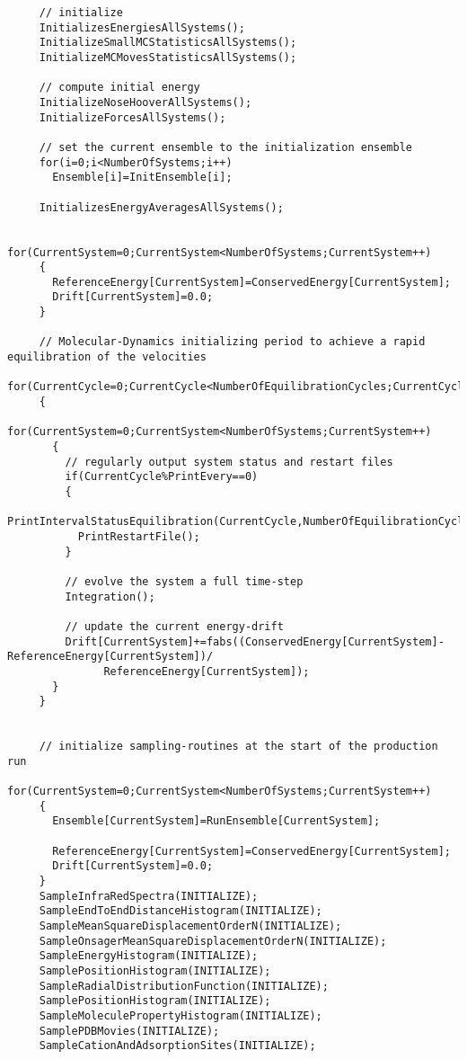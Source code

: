 \begin{footnotesize}
\begin{verbatim}
     // initialize
     InitializesEnergiesAllSystems();
     InitializeSmallMCStatisticsAllSystems();
     InitializeMCMovesStatisticsAllSystems();

     // compute initial energy
     InitializeNoseHooverAllSystems();
     InitializeForcesAllSystems();

     // set the current ensemble to the initialization ensemble
     for(i=0;i<NumberOfSystems;i++)
       Ensemble[i]=InitEnsemble[i];

     InitializesEnergyAveragesAllSystems();

     for(CurrentSystem=0;CurrentSystem<NumberOfSystems;CurrentSystem++)
     {
       ReferenceEnergy[CurrentSystem]=ConservedEnergy[CurrentSystem];
       Drift[CurrentSystem]=0.0;
     }

     // Molecular-Dynamics initializing period to achieve a rapid equilibration of the velocities
     for(CurrentCycle=0;CurrentCycle<NumberOfEquilibrationCycles;CurrentCycle++)
     {
       for(CurrentSystem=0;CurrentSystem<NumberOfSystems;CurrentSystem++)
       {
         // regularly output system status and restart files
         if(CurrentCycle%PrintEvery==0)
         {
           PrintIntervalStatusEquilibration(CurrentCycle,NumberOfEquilibrationCycles,OutputFilePtr[CurrentSystem]);
           PrintRestartFile();
         }

         // evolve the system a full time-step
         Integration();

         // update the current energy-drift
         Drift[CurrentSystem]+=fabs((ConservedEnergy[CurrentSystem]-ReferenceEnergy[CurrentSystem])/
               ReferenceEnergy[CurrentSystem]);
       }
     }


     // initialize sampling-routines at the start of the production run
     for(CurrentSystem=0;CurrentSystem<NumberOfSystems;CurrentSystem++)
     {
       Ensemble[CurrentSystem]=RunEnsemble[CurrentSystem];

       ReferenceEnergy[CurrentSystem]=ConservedEnergy[CurrentSystem];
       Drift[CurrentSystem]=0.0;
     }
     SampleInfraRedSpectra(INITIALIZE);
     SampleEndToEndDistanceHistogram(INITIALIZE);
     SampleMeanSquareDisplacementOrderN(INITIALIZE);
     SampleOnsagerMeanSquareDisplacementOrderN(INITIALIZE);
     SampleEnergyHistogram(INITIALIZE);
     SamplePositionHistogram(INITIALIZE);
     SampleRadialDistributionFunction(INITIALIZE);
     SamplePositionHistogram(INITIALIZE);
     SampleMoleculePropertyHistogram(INITIALIZE);
     SamplePDBMovies(INITIALIZE);
     SampleCationAndAdsorptionSites(INITIALIZE);


\end{verbatim}
\end{footnotesize}
